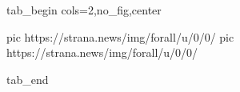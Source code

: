  
 
 
 
 

\ifcmt
  tab_begin cols=2,no_fig,center

     pic https://strana.news/img/forall/u/0/0/%
		 pic https://strana.news/img/forall/u/0/0/%

  tab_end
\fi
